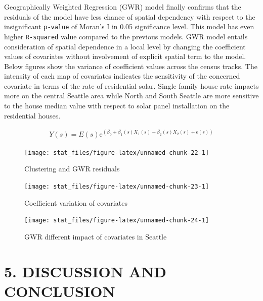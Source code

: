 \documentclass[11pt,]{article}
\begin{document}
Geographically Weighted Regression (GWR) model finally confirms that the
residuals of the model have less chance of spatial dependency with
respect to the insignificant \texttt{p-value} of Moran's I in 0.05
significance level. This model has even higher \texttt{R-squared} value
compared to the previous models. GWR model entails consideration of
spatial dependence in a local level by changing the coefficient values
of covariates without involvement of explicit spatial term to the model.
Below figures show the variance of coefficient values across the census
tracks. The intensity of each map of covariates indicates the
sensitivity of the concerned covariate in terms of the rate of
residential solar. Single family house rate impacts more on the central
Seattle area while North and South Seattle are more sensitive to the
house median value with respect to solar panel installation on the
residential houses.

\[
\begin{aligned}
Y(s) = E(s)\mbox{e}^{(\beta_{0}+\beta_{1}(s)X_1(s)+\beta_{2}(s)X_2(s)+\epsilon(s))}
\end{aligned} 
\]

\begin{figure}

{\centering \texttt{[image: stat\_files/figure-latex/unnamed-chunk-22-1]} 

}

\caption{Clustering and GWR residuals}\label{fig:unnamed-chunk-22}
\end{figure}
\begin{figure}

{\centering \texttt{[image: stat\_files/figure-latex/unnamed-chunk-23-1]} 

}

\caption{Coefficient variation of covariates}\label{fig:unnamed-chunk-23}
\end{figure}
\begin{figure}

{\centering \texttt{[image: stat\_files/figure-latex/unnamed-chunk-24-1]} 

}

\caption{GWR different impact of covariates in Seattle}\label{fig:unnamed-chunk-24}
\end{figure}

\hypertarget{discussion-and-conclusion}{%
\section{5. DISCUSSION AND CONCLUSION}\label{discussion-and-conclusion}}
\end{document}
